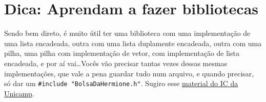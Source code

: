 \documentclass[a4paper]{article}
\begin{document}
    \section*{Dica: Aprendam a fazer bibliotecas}
    Sendo bem direto, é muito útil ter uma biblioteca com uma implementação de
    uma lista encadeada, outra com uma lista duplamente encadeada, outra com uma
    pilha, uma pilha com implementação de vetor, com implementação de lista
    encadeada, e por aí vai\ldots Vocês vão precisar tantas vezes dessas mesmas
    implementações, que vale a pena guardar tudo num arquivo, e quando precisar,
    só dar um \verb|#include "BolsaDaHermione.h"|. Sugiro esse
    \href{https://drive.google.com/file/d/1GKyZKR66TfSpYVjgxOq4uDup1GitjZtC/view?usp=sharing}{material
    do IC da Unicamp}.
\end{document}
